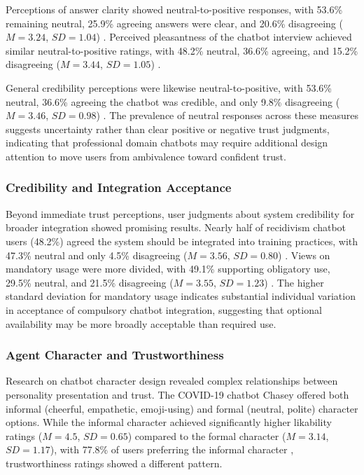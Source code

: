 \documentclass[manuscript,anonymous,sigconf]{acmart}
\begin{document}
Perceptions of answer clarity showed neutral-to-positive responses, with 53.6\% remaining neutral, 25.9\% agreeing answers were clear, and 20.6\% disagreeing ($M = 3.24$, $SD = 1.04$) \cite{A54}. Perceived pleasantness of the chatbot interview achieved similar neutral-to-positive ratings, with 48.2\% neutral, 36.6\% agreeing, and 15.2\% disagreeing ($M = 3.44$, $SD = 1.05$) \cite{A54}.

General credibility perceptions were likewise neutral-to-positive, with 53.6\% neutral, 36.6\% agreeing the chatbot was credible, and only 9.8\% disagreeing ($M = 3.46$, $SD = 0.98$) \cite{A54}. The prevalence of neutral responses across these measures suggests uncertainty rather than clear positive or negative trust judgments, indicating that professional domain chatbots may require additional design attention to move users from ambivalence toward confident trust.

\subsubsection{Credibility and Integration Acceptance}

Beyond immediate trust perceptions, user judgments about system credibility for broader integration showed promising results. Nearly half of recidivism chatbot users (48.2\%) agreed the system should be integrated into training practices, with 47.3\% neutral and only 4.5\% disagreeing ($M = 3.56$, $SD = 0.80$) \cite{A54}. Views on mandatory usage were more divided, with 49.1\% supporting obligatory use, 29.5\% neutral, and 21.5\% disagreeing ($M = 3.55$, $SD = 1.23$) \cite{A54}. The higher standard deviation for mandatory usage indicates substantial individual variation in acceptance of compulsory chatbot integration, suggesting that optional availability may be more broadly acceptable than required use.

\subsubsection{Agent Character and Trustworthiness}

Research on chatbot character design revealed complex relationships between personality presentation and trust. The COVID-19 chatbot Chasey offered both informal (cheerful, empathetic, emoji-using) and formal (neutral, polite) character options. While the informal character achieved significantly higher likability ratings ($M = 4.5$, $SD = 0.65$) compared to the formal character ($M = 3.14$, $SD = 1.17$), with 77.8\% of users preferring the informal character \cite{A79}, trustworthiness ratings showed a different pattern.
\end{document}
